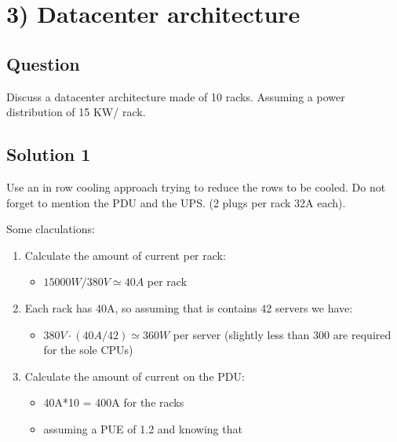 \hypertarget{datacenter-architecture}{%
\section{3) Datacenter architecture}\label{datacenter-architecture}}

\hypertarget{question-2}{%
\subsection{Question}\label{question-2}}

Discuss a datacenter architecture made of 10 racks. Assuming a power
distribution of 15 KW/ rack.

\hypertarget{solution-2}{%
\subsection{Solution 1}\label{solution-2}}

Use an in row cooling approach trying to reduce the rows to be cooled.
Do not forget to mention the PDU and the UPS. (2 plugs per rack 32A
each).

Some claculations:

\begin{enumerate}
\def\labelenumi{\arabic{enumi}.}
\item
  Calculate the amount of current per rack:

  \begin{itemize}
  \item
    $15000W/380V \simeq 40A$ per rack
  \end{itemize}
\item
  Each rack has 40A, so assuming that is contains 42 servers we have:

  \begin{itemize}
  \item
    $380V\cdot(40A/42) \simeq 360W$ per server (slightly less than
    300 are required for the sole CPUs)
  \end{itemize}
\item
  Calculate the amount of current on the PDU:

  \begin{itemize}
  \item
    40A*10 = 400A for the racks
  \item
    assuming a PUE of 1.2 and knowing that
  \end{itemize}
\end{enumerate}

